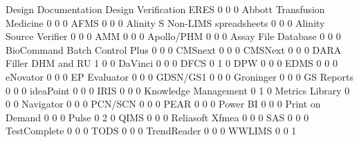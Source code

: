 \documentclass{article}
\begin{document}
\begin{Schunk}
\begin{Soutput}
                                  Design Documentation Design Verification ERES
                                                     0                   0    0
  Abbott Transfusion Medicine                        0                   0    0
  AFMS                                               0                   0    0
  Alinity S Non-LIMS spreadsheets                    0                   0    0
  Alinity Source Verifier                            0                   0    0
  AMM                                                0                   0    0
  Apollo/PHM                                         0                   0    0
  Assay File Database                                0                   0    0
  BioCommand Batch Control Plus                      0                   0    0
  CMSnext                                            0                   0    0
  CMSNext                                            0                   0    0
  DARA Filler DHM and RU                             1                   0    0
  DaVinci                                            0                   0    0
  DFCS                                               0                   1    0
  DPW                                                0                   0    0
  EDMS                                               0                   0    0
  eNovator                                           0                   0    0
  EP Evaluator                                       0                   0    0
  GDSN/GS1                                           0                   0    0
  Groninger                                          0                   0    0
  GS Reports                                         0                   0    0
  ideaPoint                                          0                   0    0
  IRIS                                               0                   0    0
  Knowledge Management                               0                   1    0
  Metrics Library                                    0                   0    0
  Navigator                                          0                   0    0
  PCN/SCN                                            0                   0    0
  PEAR                                               0                   0    0
  Power BI                                           0                   0    0
  Print on Demand                                    0                   0    0
  Pulse                                              0                   2    0
  QIMS                                               0                   0    0
  Reliasoft Xfmea                                    0                   0    0
  SAS                                                0                   0    0
  TestComplete                                       0                   0    0
  TODS                                               0                   0    0
  TrendReader                                        0                   0    0
  WWLIMS                                             0                   0    1
                                 

\end{Soutput}
\end{Schunk}
\end{document}

